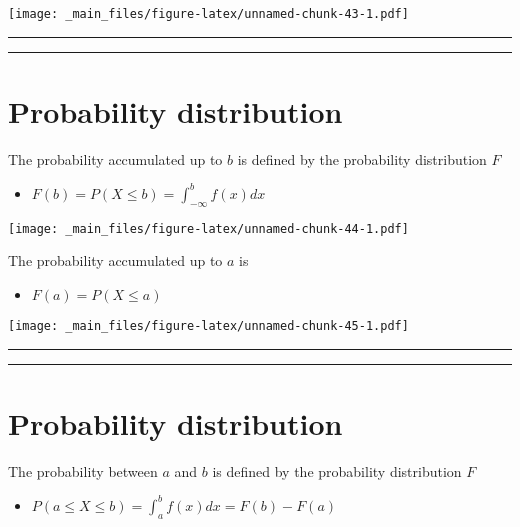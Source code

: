 \documentclass[
]{book}
\providecommand{\tightlist}{%
  \setlength{\itemsep}{0pt}\setlength{\parskip}{0pt}}
\begin{document}
\texttt{[image: \_main\_files/figure-latex/unnamed-chunk-43-1.pdf]}

\begin{center}\rule{0.5\linewidth}{0.5pt}\end{center}

\begin{center}\rule{0.5\linewidth}{0.5pt}\end{center}

\hypertarget{probability-distribution-2}{%
\section{Probability distribution}\label{probability-distribution-2}}

The probability accumulated up to \(b\) is defined by the probability distribution \(F\)

\begin{itemize}
\tightlist
\item
  \(F(b) = P(X \leq b)=\int_{-\infty}^bf(x)dx\)
\end{itemize}

\texttt{[image: \_main\_files/figure-latex/unnamed-chunk-44-1.pdf]}

The probability accumulated up to \(a\) is

\begin{itemize}
\tightlist
\item
  \(F(a) = P(X \leq a)\)
\end{itemize}

\texttt{[image: \_main\_files/figure-latex/unnamed-chunk-45-1.pdf]}

\begin{center}\rule{0.5\linewidth}{0.5pt}\end{center}

\begin{center}\rule{0.5\linewidth}{0.5pt}\end{center}

\hypertarget{probability-distribution-3}{%
\section{Probability distribution}\label{probability-distribution-3}}

The probability between \(a\) and \(b\) is defined by the probability distribution \(F\)

\begin{itemize}
\tightlist
\item
  \(P(a\leq X \leq b) = \int_a^b f(x)dx=F(b)-F(a)\)
\end{itemize}
\end{document}
